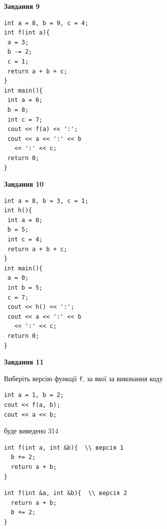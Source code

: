 \documentclass[12pt, ukrainian]{article}
\def\code#1{\Verb!#1!}
\begin{document}
{\begin {large}
\begin{minipage}[t]{11.0cm}
\end{minipage}


\begin{minipage}[t]{7.0cm}

\begin{center}
\textbf{Завдання 9}
\end{center}
\vspace{-8mm}

\begin{verbatim}
int a = 8, b = 9, c = 4;
int f(int a){
 a = 3;
 b -= 2;
 c = 1;
 return a + b + c;
}
int main(){
 int a = 6;
 b = 8;
 int c = 7;
 cout << f(a) << ':';
 cout << a << ':' << b 
   << ':' << c;
 return 0;
}
\end{verbatim}



\begin{center}
\textbf{Завдання 10}
\end{center}
\vspace{-8mm}

\begin{verbatim}
int a = 8, b = 3, c = 1;
int h(){
 int a = 8;
 b = 5;
 int c = 4;
 return a + b + c;
}
int main(){
 a = 0;
 int b = 5;
 c = 7;
 cout << h() << ':';
 cout << a << ':' << b 
   << ':' << c;
 return 0;
}
\end{verbatim}

\end{minipage}
\vline \hspace{1mm}
\begin{minipage}[t]{11.0cm}

\begin{center}
\textbf{Завдання 11}
\end{center}
Виберіть версію функції \code{f}, за якої за виконання коду
\begin{verbatim}
int a = 1, b = 2;
cout << f(a, b);
cout << a << b;
\end{verbatim}

буде виведено 314

\begin{verbatim}
int f(int a, int &b){  \\ версія 1
  b += 2;
  return a + b;
}
\end{verbatim}

\vspace{-8mm}\begin{verbatim}
int f(int &a, int &b){  \\ версія 2
  return a + b;
  b += 2;
}
\end{verbatim}


\end{minipage}
\end{large}}
\end{document}
